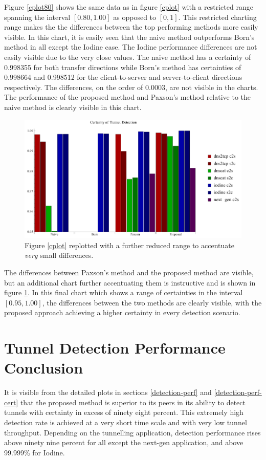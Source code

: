 \documentclass[12pt]{report}
\theoremstyle{remark}
\theoremstyle{definition}
\theoremstyle{definition}
\theoremstyle{definition}
\begin{document}
Figure \ref{cplot80} shows the same data as in figure \ref{cplot} with a
restricted range spanning the interval $[0.80,1.00]$ as opposed to $[0,1]$. This
restricted charting range makes the the differences between the top performing
methods more easily visible. In this chart, it is easily seen that the naive
method outperforms Born's method in all except the Iodine case. The Iodine
performance differences are not easily visible due to the very close values. The
naive method has a certainty of 0.998355 for both transfer directions while
Born's method has certainties of 0.998664 and 0.998512 for the client-to-server
and server-to-client directions respectively. The differences, on the order of
0.0003, are not visible in the charts. The performance of the proposed method
and Paxson's method relative to the naive method is clearly visible in this
chart.

\begin{figure}
\centering
\includegraphics[width=\textwidth]{../figures/cplot3.pdf}
\caption[Chart of Certainty of Detection by Tunnel Application and Detection
Method - 0.95 to 1.00]{Figure \ref{cplot} replotted with a further reduced range to
accentuate \emph{very} small differences.}
\label{cplot95}
\end{figure}

The differences between Paxson's method and the proposed method are visible, but
an additional chart further accentuating them is instructive and is shown in
figure \ref{cplot95}. In this final chart which shows a range of certainties in
the interval $[0.95,1.00]$, the differences between the two methods are clearly
visible, with the proposed approach achieving a higher certainty in every
detection scenario.

\section{Tunnel Detection Performance Conclusion}
It is visible from the detailed plots in sections \ref{detection-perf} and
\ref{detection-perf-cert} that the proposed method is superior to its peers in
its ability to detect tunnels with certainty in excess of ninety eight percent.
This extremely high detection rate is achieved at a very short time scale and
with very low tunnel throughput. Depending on the tunnelling application,
detection performance rises above ninety nine percent for all except the
next-gen application, and above 99.999\% for Iodine.
\end{document}
